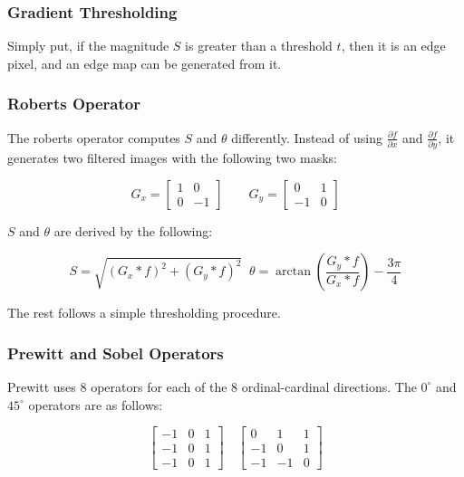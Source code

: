 \documentclass{article}
\begin{document}
\begin{multicols}{2}
\subsubsection{Gradient Thresholding}

Simply put, if the magnitude $S$ is greater than a threshold $t$, then it is an edge pixel, and an edge map can be generated from it.

\subsubsection{Roberts Operator}

The roberts operator computes $S$ and $\theta$ differently. Instead of using $\frac{\partial f}{\partial x}$ and $\frac{\partial f}{\partial y}$, it generates two filtered images with the following two masks:

$$
G_x = \left[\begin{matrix}1 & 0\\ 0 & -1\end{matrix}\right] \quad\quad G_y = \left[\begin{matrix}0 & 1\\ -1 & 0\end{matrix}\right]
$$

$S$ and $\theta$ are derived by the following:

$$
S = \sqrt{\left(G_x * f\right)^2 + \left(G_y * f\right)^2} \;\; \theta = \arctan\left(\frac{G_y * f}{G_x * f}\right) - \frac{3\pi}{4}
$$

The rest follows a simple thresholding procedure.

\subsubsection{Prewitt and Sobel Operators}

Prewitt uses 8 operators for each of the 8 ordinal-cardinal directions. The $0^{\circ}$ and $45^{\circ}$ operators are as follows:

$$
\begin{bmatrix}
  -1 & 0 & 1\\
  -1 & 0 & 1\\
  -1 & 0 & 1
\end{bmatrix}\quad
\begin{bmatrix}
  0 & 1 & 1\\
  -1 & 0 & 1\\
  -1 & -1 & 0
\end{bmatrix}
$$


\end{multicols}
\end{document}
